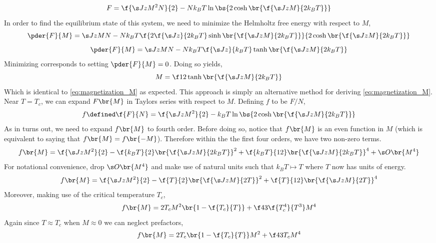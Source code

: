 \documentclass{article}
\begin{document}
\[F = \f{\s J z M^2 N}{2} - Nk_B T \ln\bs{2 \cosh \br{\f{\s J z M}{2 k_B T}}} \]
In order to find the equilibrium state of this system, we need to minimize the Helmholtz free energy with respect to $M$,
\[ \pder{F}{M} = \s J z M N - N k_B T \f{2 \f{\s J z}{2 k_B T} \sinh \br{\f{\s J z M}{2 k_B T}}}{2 \cosh \br{\f{\s J z M}{2 k_B T}}}\]
\[ \pder{F}{M} = \s J z M N - N k_B T \f{\s J z}{k_B T} \tanh \br{\f{\s J z M}{2 k_B T}} \]
Minimizing corresponds to setting $\pder{F}{M} = 0$. Doing so yields,
\[ M = \f12 \tanh \br{\f{\s J z M}{2 k_B T}} \]
Which is identical to \cref{eq:magnetization_M} as expected. This approach is simply an alternative method for deriving \cref{eq:magnetization_M}. Near $T = T_c$, we can expand $F\br{M}$ in Taylors series with respect to $M$. Defining $f$ to be $F / N$,
\[ f \defined \f{F}{N} = \f{\s J z M^2}{2} - k_B T \ln\bs{2 \cosh \br{\f{\s J z M}{2 k_B T}}} \]
As in turns out, we need to expand $f\br{M}$ to fourth order. Before doing so, notice that $f\br{M}$ is an even function in $M$ (which is equivalent to saying that $f\br{M} = f\br{-M}$). Therefore within the the first four orders, we have two non-zero terms.
\[ f\br{M} = \f{\s J z M^2}{2} - \f{k_B T}{2} \br{\f{\s J z M}{2 k_B T}}^2 + \f{k_B T}{12} \br{\f{\s J z M}{2 k_B T}}^4 + \s O \br{M^4} \]
For notational convenience, drop $\s O \br{M^4}$ and make use of natural units such that $k_B T \mapsto T$ where $T$ now has units of energy.
\[ f\br{M} = \f{\s J z M^2}{2} - \f{T}{2} \br{\f{\s J z M}{2 T}}^2 + \f{T}{12} \br{\f{\s J z M}{2 T}}^4 \]
Moreover, making use of the critical temperature $T_c$,
\[ f\br{M} = 2 T_c M^2 \br{1 - \f{T_c}{T}} + \f43 \f{T_c^4}{T^3} M^4 \]
Again since $T \approx T_c$ when $M \approx 0$ we can neglect prefactors,
\[ f\br{M} = 2 T_c \br{1 - \f{T_c}{T}} M^2 + \f43 T_c M^4 \]

\begin{center}
\end{center}
\end{document}
